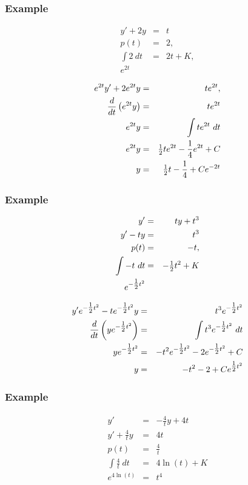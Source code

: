 \begin{frame}
  \frametitle{Example}

  \vspace*{-3em}
  \begin{eqnarray*}
    y' + 2y & = & t \\
    p(t) & = & 2, \\
    \int 2 ~ dt & = & 2t + K, \\
    e^{2t} & & 
  \end{eqnarray*}

  \begin{eqnarray*}
    e^{2t} y' + 2 e^{2t} y & = & t e^{2t}, \\
    \frac{d}{dt} \left( e^{2t} y \right) & = & t e^{2t} \\
    e^{2t} y & = & \int t e^{2t} ~ dt \\
    e^{2t} y & = & \mbox{$\frac{1}{2}$} t e^{2t} - \frac{1}{4} e^{2t} + C \\
    y & = & \mbox{$\frac{1}{2}$} t - \frac{1}{4} + C e^{-2t}
  \end{eqnarray*}

\end{frame}



\begin{frame}
  \frametitle{Example}

  \vspace*{-3em}
  \begin{eqnarray*}
    y' & = & ty + t^3 \\
    y' - ty & = & t^3 \\
    p(t) & = & -t, \\
    \int -t ~ dt & = & -\mbox{$\frac{1}{2}$} t^2 + K \\
    e^{-\mbox{$\frac{1}{2}$} t^2} & & 
  \end{eqnarray*}

  \begin{eqnarray*}
    y' e^{-\mbox{$\frac{1}{2}$} t^2} - t e^{-\mbox{$\frac{1}{2}$} t^2} y & = & t^3 e^{-\mbox{$\frac{1}{2}$} t^2} \\
    \frac{d}{dt} \left( y e^{-\mbox{$\frac{1}{2}$} t^2} \right) & = & \int t^3 e^{-\mbox{$\frac{1}{2}$} t^2} ~ dt \\
    y e^{-\mbox{$\frac{1}{2}$} t^2} & = & -t^2 e^{-\mbox{$\frac{1}{2}$} t^2} - 2 e^{-\mbox{$\frac{1}{2}$} t^2} + C \\
    y & = & -t^2 - 2 + C e^{\mbox{$\frac{1}{2}$} t^2}
  \end{eqnarray*}

\end{frame}



\begin{frame}
  \frametitle{Example}

  \begin{eqnarray*}
    y' & = & -\frac{4}{t} y + 4 t \\
    y' + \frac{4}{t} y & = & 4 t \\
    p(t) & = & \frac{4}{t} \\
    \int \frac{4}{t} ~ dt & = & 4 \ln(t) + K \\
    e^{4 \ln(t) } & = & t^4
  \end{eqnarray*}

\end{frame}


